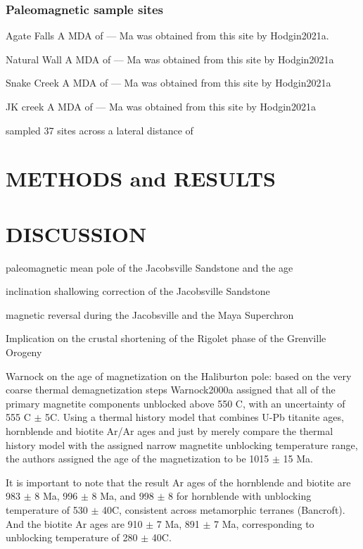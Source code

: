 \documentclass[draft]{agujournal2019}
\begin{document}
\subsubsection{Paleomagnetic sample sites}
Agate Falls
A MDA of --- Ma was obtained from this site by Hodgin2021a. 

Natural Wall
A MDA of --- Ma was obtained from this site by Hodgin2021a

Snake Creek
A MDA of --- Ma was obtained from this site by Hodgin2021a

JK creek
A MDA of --- Ma was obtained from this site by Hodgin2021a



\cite{Roy1978a} sampled 37 sites across a lateral distance of 


\section*{METHODS and RESULTS}



\section*{DISCUSSION}

paleomagnetic mean pole of the Jacobsville Sandstone and the age

inclination shallowing correction of the Jacobsville Sandstone

magnetic reversal during the Jacobsville and the Maya Superchron

Implication on the crustal shortening of the Rigolet phase of the Grenville Orogeny

Warnock on the age of magnetization on the Haliburton pole: based on the very coarse thermal demagnetization steps Warnock2000a assigned that all of the primary magnetite components unblocked above 550 \textdegree C, with an uncertainty of 555 \textdegree C $\pm$ 5\textdegree C. Using a thermal history model that combines U-Pb titanite ages, hornblende and biotite Ar/Ar ages and just by merely compare the thermal history model with the assigned narrow magnetite unblocking temperature range, the authors assigned the age of the magnetization to be 1015 $\pm$ 15 Ma. 

It is important to note that the result Ar ages of the hornblende and biotite are 983 $\pm$ 8 Ma, 996 $\pm$ 8 Ma, and 998 $\pm$ 8 for hornblende with unblocking temperature of 530 $\pm$ 40\textdegree C, consistent across metamorphic terranes (Bancroft). And the biotite Ar ages are 910 $\pm$ 7 Ma, 891 $\pm$ 7 Ma, corresponding to unblocking temperature of 280 $\pm$ 40\textdegree C. 
\end{document}
